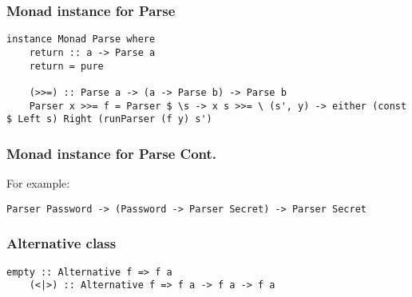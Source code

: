 \documentclass{beamer}
\begin{document}
\begin{frame}
  \frametitle{Monad instance for Parse}


  \begin{lstlisting}[frame=single]
  instance Monad Parse where
    return :: a -> Parse a
    return = pure

    (>>=) :: Parse a -> (a -> Parse b) -> Parse b
    Parser x >>= f = Parser $ \s -> x s >>= \ (s', y) -> either (const $ Left s) Right (runParser (f y) s')
  \end{lstlisting}

\end{frame}


\begin{frame}
  \frametitle{Monad instance for Parse Cont.}

  For example:
  \begin{lstlisting}[frame=single]
    Parser Password -> (Password -> Parser Secret) -> Parser Secret
  \end{lstlisting}


\end{frame}


\begin{frame}
  \frametitle{Alternative class}

  \begin{lstlisting}[frame=single]
    empty :: Alternative f => f a
    (<|>) :: Alternative f => f a -> f a -> f a
  \end{lstlisting}

\end{frame}
\end{document}
